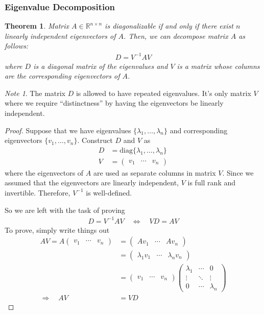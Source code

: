 \documentclass[12pt]{article}
\numberwithin{equation}{section} %
\theoremstyle{plain}
\newtheorem{thm}{Theorem}[section]
\theoremstyle{definition}
\theoremstyle{remark}
\newtheorem*{note}{Note}
\newcommand{\diag}{\text{diag}}
\newcommand{\Rnn}{\mathbb{R}^{n\times n}}
\begin{document}
\clearpage
\subsubsection{Eigenvalue Decomposition}
\label{subsec:eigenvaluedecomp}

\begin{thm}
\label{thm:eigendecomp}
Matrix $A\in \Rnn$ is diagonalizable if and only if there exist $n$
linearly independent eigenvectors of $A$. Then, we can decompose matrix
$A$ as follows:
\begin{align*}
  D = V^{-1} A V
\end{align*}
where $D$ is a diagonal matrix of the eigenvalues and $V$ is a matrix
whose columns are the corresponding eigenvectors of $A$.
\end{thm}
\begin{note}
The matrix $D$ is allowed to have repeated eigenvalues. It's only matrix
$V$ where we require ``distinctness'' by having the eigenvectors be
linearly independent.
\end{note}

\begin{proof}
Suppose that we have eigenvalues $\{\lambda_1,\ldots,\lambda_n\}$ and
corresponding eigenvectors $\{v_1,\ldots,v_n\}$.
Construct $D$ and $V$ as
\begin{align*}
  D &= \diag\{\lambda_1, \ldots, \lambda_n\} \\
  V &=
  \begin{pmatrix}
    v_1 & \cdots & v_n
  \end{pmatrix}
\end{align*}
where the eigenvectors of $A$ are used as separate columns in matrix
$V$.  Since we assumed that the eigenvectors are linearly independent,
$V$ is full rank and invertible. Therefore, $V^{-1}$ is well-defined.

So we are left with the task of proving
\begin{align*}
  D = V^{-1} A V
  \quad\Leftrightarrow\quad
  VD = A V
\end{align*}
To prove, simply write things out
\begin{align*}
  AV = A
  \begin{pmatrix}
    v_1 & \cdots & v_n
  \end{pmatrix}
  &=
  \begin{pmatrix}
    Av_1 & \cdots & Av_n
  \end{pmatrix} \\
  &=
  \begin{pmatrix}
    \lambda_1 v_1 & \cdots & \lambda_n v_n
  \end{pmatrix} \\
  &=
  \begin{pmatrix}
    v_1 & \cdots & v_n
  \end{pmatrix}
  \begin{pmatrix}
    \lambda_1 & \cdots & 0 \\
    \vdots & \ddots & \vdots \\
    0 & \cdots & \lambda_n
  \end{pmatrix}\\
  \Rightarrow\quad
  AV &= VD
\end{align*}
\end{proof}
\end{document}
